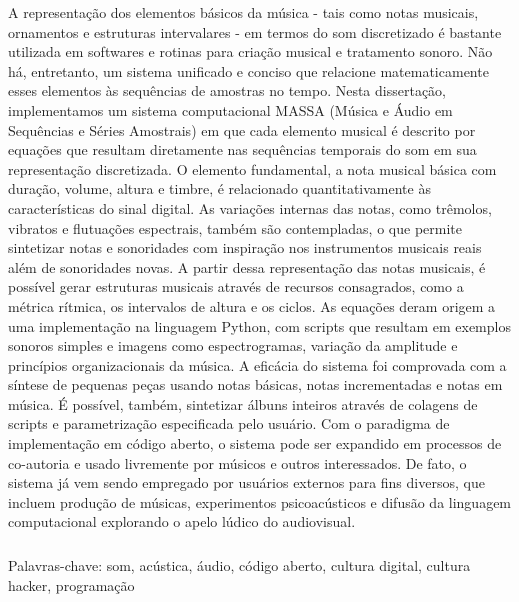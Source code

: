 \begin{resumo}

A representação dos elementos básicos da música - tais como notas musicais, ornamentos e estruturas intervalares - em termos do som discretizado é bastante utilizada em softwares e rotinas para criação musical e tratamento sonoro. Não há, entretanto, um sistema unificado e conciso que relacione matematicamente esses elementos às sequências de amostras no tempo. Nesta dissertação, implementamos um sistema computacional MASSA (Música e Áudio em Sequências e Séries Amostrais) em que cada elemento musical é descrito por equações que resultam diretamente nas sequências temporais do som em sua representação discretizada. O elemento fundamental, a nota musical básica com duração, volume, altura e timbre, é relacionado quantitativamente às características do sinal digital. As variações internas das notas, como trêmolos, vibratos e flutuações espectrais, também são contempladas, o que permite sintetizar notas e sonoridades com inspiração nos instrumentos musicais reais além de sonoridades novas. A partir dessa representação das notas musicais, é possível gerar estruturas musicais através de recursos consagrados, como a métrica rítmica, os intervalos de altura e os ciclos. As equações deram origem a uma implementação na linguagem Python, com scripts que resultam em exemplos sonoros simples e imagens como espectrogramas, variação da amplitude e princípios organizacionais da música. A eficácia do sistema foi comprovada com a síntese de pequenas peças usando notas básicas, notas incrementadas e notas em música. É possível, também, sintetizar álbuns inteiros através de colagens de scripts e parametrização especificada pelo usuário. Com o paradigma de implementação em código aberto, o sistema pode ser expandido em processos de co-autoria e usado livremente por músicos e outros interessados. De fato, o sistema já vem sendo empregado por usuários externos para fins diversos, que incluem produção de músicas, experimentos psicoacústicos e difusão da linguagem computacional explorando o apelo lúdico do audiovisual.


$\phantom{linha em branco}$\\
Palavras-chave: som, acústica, áudio, código aberto, cultura digital, cultura hacker, programação

\end{resumo}


